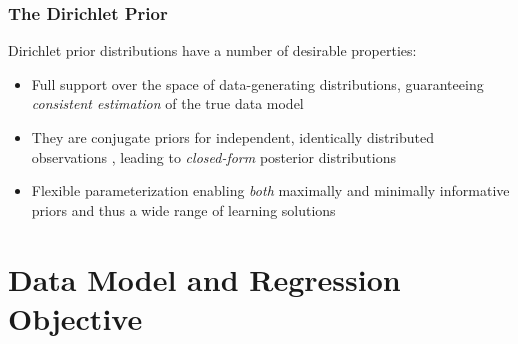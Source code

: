 \documentclass[aspectratio=169]{beamer}
\begin{document}
\begin{frame}
\frametitle{The Dirichlet Prior}

Dirichlet prior distributions have a number of desirable properties:
\begin{itemize}
\vspace{0.5em}
\item \alert{Full support} over the space of data-generating distributions, guaranteeing \emph{consistent estimation} of the true data model
\vspace{0.5em}
\item They are \alert{conjugate priors} for independent, identically distributed observations , leading to \emph{closed-form} posterior distributions
\vspace{0.5em}
\item \alert{Flexible parameterization} enabling \emph{both} maximally and minimally informative priors and thus a wide range of learning solutions
\end{itemize}

\end{frame}



\section{Data Model and Regression Objective}
\end{document}
